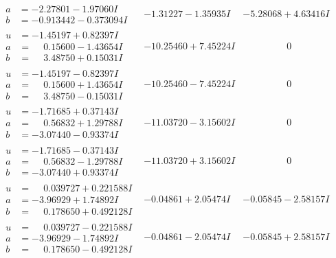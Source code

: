 \documentclass[1p]{elsarticle_modified}
\theoremstyle{definition}
\begin{document}
$$\begin{array}{c|c|c}
\begin{aligned}
a &= -2.27801 - 1.97060 I \\
b &= -0.913442 - 0.373094 I\end{aligned}
 & -1.31227 - 1.35935 I & -5.28068 + 4.63416 I \\ \hline\begin{aligned}
u &= -1.45197 + 0.82397 I \\
a &= \phantom{-}0.15600 - 1.43654 I \\
b &= \phantom{-}3.48750 + 0.15031 I\end{aligned}
 & -10.25460 + 7.45224 I & \phantom{-0.000000 } 0 \\ \hline\begin{aligned}
u &= -1.45197 - 0.82397 I \\
a &= \phantom{-}0.15600 + 1.43654 I \\
b &= \phantom{-}3.48750 - 0.15031 I\end{aligned}
 & -10.25460 - 7.45224 I & \phantom{-0.000000 } 0 \\ \hline\begin{aligned}
u &= -1.71685 + 0.37143 I \\
a &= \phantom{-}0.56832 + 1.29788 I \\
b &= -3.07440 - 0.93374 I\end{aligned}
 & -11.03720 - 3.15602 I & \phantom{-0.000000 } 0 \\ \hline\begin{aligned}
u &= -1.71685 - 0.37143 I \\
a &= \phantom{-}0.56832 - 1.29788 I \\
b &= -3.07440 + 0.93374 I\end{aligned}
 & -11.03720 + 3.15602 I & \phantom{-0.000000 } 0 \\ \hline\begin{aligned}
u &= \phantom{-}0.039727 + 0.221588 I \\
a &= -3.96929 + 1.74892 I \\
b &= \phantom{-}0.178650 + 0.492128 I\end{aligned}
 & -0.04861 + 2.05474 I & -0.05845 - 2.58157 I \\ \hline\begin{aligned}
u &= \phantom{-}0.039727 - 0.221588 I \\
a &= -3.96929 - 1.74892 I \\
b &= \phantom{-}0.178650 - 0.492128 I\end{aligned}
 & -0.04861 - 2.05474 I & -0.05845 + 2.58157 I \\ \hline\begin{aligned}

\end{aligned}
\end{array}$$
\end{document}
